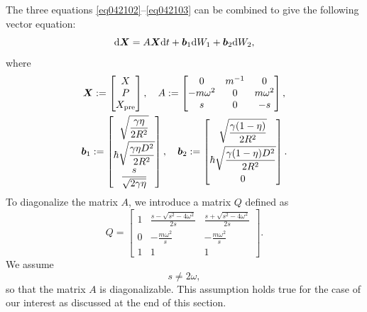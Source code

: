 \documentclass[aps,pra,superscriptaddress,twocolumn
]{revtex4-2}
\renewcommand{\d}{{\rm d}}
\begin{document}
 The three equations \eqref{eq042102}--\eqref{eq042103} can be 
 combined to give the following vector equation:
 \begin{equation}
  \d \bm X = A \bm X \d t + \bm b_1 \d W_1 + \bm b_2 \d W_2, \label{eq011601}
 \end{equation}
 where 
 \begin{gather}
  \bm X := \begin{bmatrix}
  X \\P \\ X_{\rm pre}
   \end{bmatrix}, \quad 
  A := \begin{bmatrix}
     0 & m^{-1} & 0 \\ -m\omega^2 & 0 & m\omega^2 \\
  s & 0 & -s
 \end{bmatrix},\\
  \bm b_1 := \begin{bmatrix}
  \displaystyle \sqrt{\frac{\gamma\eta}{2 R^2}} \\[7pt]
  \displaystyle \hbar \sqrt{\frac{\gamma\eta D^2}{2R^2}} \\[7pt]
  \displaystyle \frac{s}{\sqrt{2 \gamma \eta}}
   \end{bmatrix}, \quad 
  \bm b_2 := \begin{bmatrix}
  \displaystyle \sqrt{\frac{\gamma(1-\eta)}{2 R^2}} \\[7pt] 
  \displaystyle \hbar \sqrt{\frac{\gamma(1-\eta) D^2}{2R^2}} \\[7pt]
       0
   \end{bmatrix}.
 \end{gather}
 To diagonalize the matrix $A$, we introduce a matrix $Q$ defined as 
 \begin{equation}
  Q = 
   \begin{bmatrix}
       1 & \displaystyle\frac{s-\sqrt{s^2 - 4\omega^2}}{2s} &\displaystyle\frac{s+\sqrt{s^2 - 4\omega^2}}{2s} \\[7pt]
       0 & \displaystyle-\frac{m\omega^2}{s} & \displaystyle-\frac{m\omega^2}{s} \\[7pt]
       1 & 1 & 1
   \end{bmatrix}.
 \end{equation}
 We assume 
 \begin{equation}
  s \neq 2\omega, \label{eq:033101}
 \end{equation}
 so that {the matrix $A$ is diagonalizable}. 
 This assumption holds true for the case of our interest 
 as discussed at the end of this section.
\end{document}
